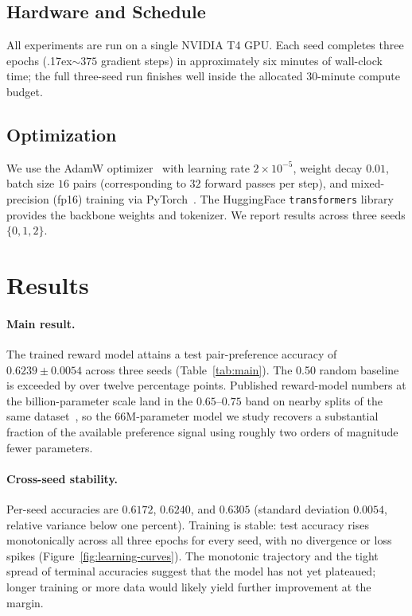 \documentclass[11pt]{article}
\newcommand{\mytilde}{{\raise.17ex\hbox{$\scriptstyle\sim$}}}
\begin{document}
\subsection{Hardware and Schedule}
All experiments are run on a single NVIDIA T4 GPU. Each seed completes three epochs (\mytilde$375$ gradient steps) in approximately six minutes of wall-clock time; the full three-seed run finishes well inside the allocated 30-minute compute budget.

\subsection{Optimization}
We use the AdamW optimizer~\cite{loshchilov2019adamw} with learning rate $2 \times 10^{-5}$, weight decay $0.01$, batch size $16$ pairs (corresponding to $32$ forward passes per step), and mixed-precision (fp16) training via PyTorch~\cite{paszke2019pytorch}. The HuggingFace \texttt{transformers} library~\cite{wolf2020transformers} provides the backbone weights and tokenizer. We report results across three seeds $\{0, 1, 2\}$.

\section{Results}
\label{sec:results}

\paragraph{Main result.} The trained reward model attains a test pair-preference accuracy of $\mathbf{0.6239 \pm 0.0054}$ across three seeds (Table~\ref{tab:main}). The 0.50 random baseline is exceeded by over twelve percentage points. Published reward-model numbers at the billion-parameter scale land in the $0.65$--$0.75$ band on nearby splits of the same dataset~\cite{bai2022hhrlhf,stiennon2020summarization}, so the 66M-parameter model we study recovers a substantial fraction of the available preference signal using roughly two orders of magnitude fewer parameters.

\paragraph{Cross-seed stability.} Per-seed accuracies are $0.6172$, $0.6240$, and $0.6305$ (standard deviation $0.0054$, relative variance below one percent). Training is stable: test accuracy rises monotonically across all three epochs for every seed, with no divergence or loss spikes (Figure~\ref{fig:learning-curves}). The monotonic trajectory and the tight spread of terminal accuracies suggest that the model has not yet plateaued; longer training or more data would likely yield further improvement at the margin.
\end{document}
